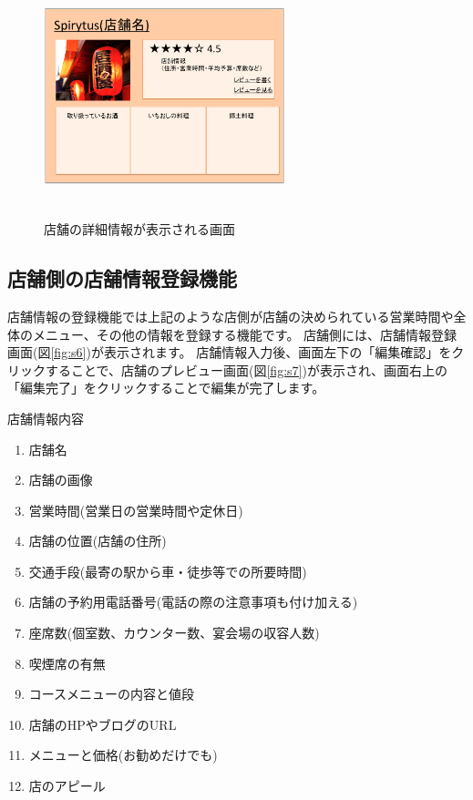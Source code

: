 \documentclass[a4j,titlepage]{jarticle}
\begin{document}
\begin {figure}[htbp]
    \begin{center}
    \includegraphics [height=7cm, width=7cm]{extrnal_design_document_image/17.eps}
    \caption {店舗の詳細情報が表示される画面}
    \label {fig:17}
    \end{center}
\end {figure}

\subsection{店舗側の店舗情報登録機能}
店舗情報の登録機能では上記のような店側が店舗の決められている営業時間や全体のメニュー、その他の情報を登録する機能です。
店舗側には、店舗情報登録画面(図\ref{fig:s6})が表示されます。
店舗情報入力後、画面左下の「編集確認」をクリックすることで、店舗のプレビュー画面(図\ref{fig:s7})が表示され、画面右上の「編集完了」をクリックすることで編集が完了します。

店舗情報内容
\begin{enumerate}
\item 店舗名
\item 店舗の画像
\item 営業時間(営業日の営業時間や定休日)
\item 店舗の位置(店舗の住所)
\item 交通手段(最寄の駅から車・徒歩等での所要時間)
\item 店舗の予約用電話番号(電話の際の注意事項も付け加える)
\item 座席数(個室数、カウンター数、宴会場の収容人数)
\item 喫煙席の有無
\item コースメニューの内容と値段
\item 店舗のHPやブログのURL
\item メニューと価格(お勧めだけでも)
\item 店のアピール
\end{enumerate}
\end{document}
